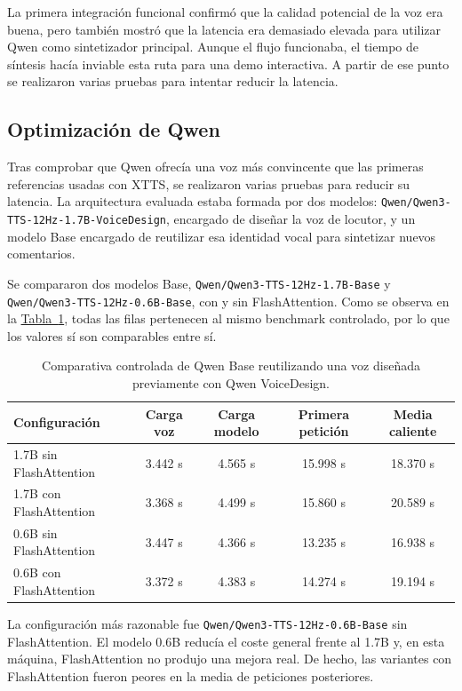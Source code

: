 La primera integración funcional confirmó que la calidad potencial de la voz era buena, pero también mostró que la latencia era demasiado elevada para utilizar Qwen como sintetizador principal. Aunque el flujo funcionaba, el tiempo de síntesis hacía inviable esta ruta para una demo interactiva. A partir de ese punto se realizaron varias pruebas para intentar reducir la latencia.

\subsection{Optimización de Qwen}

Tras comprobar que Qwen ofrecía una voz más convincente que las primeras referencias usadas con XTTS, se realizaron varias pruebas para reducir su latencia. La arquitectura evaluada estaba formada por dos modelos: \texttt{Qwen/Qwen3-TTS-12Hz-1.7B-VoiceDesign}, encargado de diseñar la voz de locutor, y un modelo Base encargado de reutilizar esa identidad vocal para sintetizar nuevos comentarios.

Se compararon dos modelos Base, \texttt{Qwen/Qwen3-TTS-12Hz-1.7B-Base} y \texttt{Qwen/Qwen3-TTS-12Hz-0.6B-Base}, con y sin FlashAttention. Como se observa en la \hyperref[tab:parametros-FlashAttention]{Tabla~\ref*{tab:parametros-FlashAttention}}, todas las filas pertenecen al mismo benchmark controlado, por lo que los valores sí son comparables entre sí.

\begin{table}[ht]
\centering
\begin{tabular}{lcccc}
\toprule
Configuración & Carga voz & Carga modelo & Primera petición & Media caliente \\
\midrule
1.7B sin FlashAttention & 3.442 s & 4.565 s & 15.998 s & 18.370 s \\
1.7B con FlashAttention & 3.368 s & 4.499 s & 15.860 s & 20.589 s \\
0.6B sin FlashAttention & 3.447 s & 4.366 s & 13.235 s & 16.938 s \\
0.6B con FlashAttention & 3.372 s & 4.383 s & 14.274 s & 19.194 s \\
\bottomrule
\end{tabular}
\caption{Comparativa controlada de Qwen Base reutilizando una voz diseñada previamente con Qwen VoiceDesign.}
\label{tab:parametros-FlashAttention}
\end{table}

La configuración más razonable fue \texttt{Qwen/Qwen3-TTS-12Hz-0.6B-Base} sin FlashAttention. El modelo 0.6B reducía el coste general frente al 1.7B y, en esta máquina, FlashAttention no produjo una mejora real. De hecho, las variantes con FlashAttention fueron peores en la media de peticiones posteriores.

